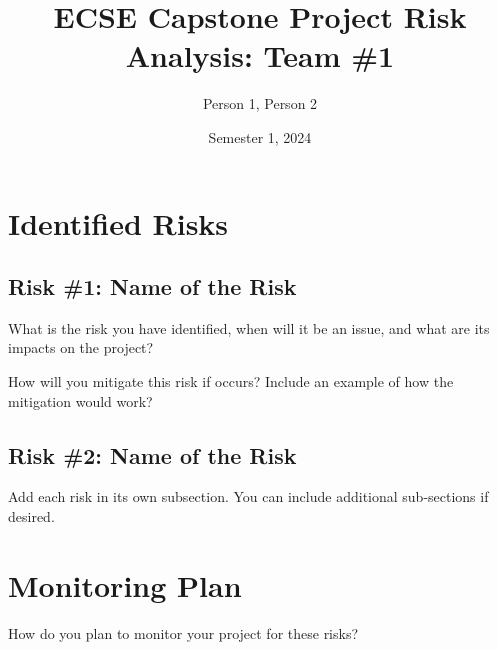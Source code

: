 \documentclass[a4paper]{article}
\begin{document}
\title{ECSE Capstone Project Risk Analysis: Team \#1}
\author{Person 1, Person 2}
\date{Semester 1, 2024}

\maketitle

\section*{Identified Risks}

\subsection*{Risk \#1: Name of the Risk}

What is the risk you have identified, when will it be an issue, and what are its impacts on the project? 

How will you mitigate this risk if occurs? Include an example of how the mitigation would work?

\subsection*{Risk \#2: Name of the Risk}

Add each risk in its own subsection. You can include additional sub-sections if desired.

\section*{Monitoring Plan}

How do you plan to monitor your project for these risks?
\end{document}
